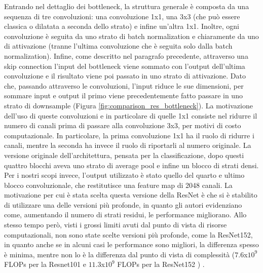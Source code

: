Entrando nel dettaglio dei bottleneck, la struttura generale è composta da una sequenza di tre convoluzioni: una convoluzione 1x1, una 3x3 (che può essere classica o dilatata a seconda dello strato) e infine un'altra 1x1. Inoltre, ogni convoluzione è seguita da uno strato di batch normalization e chiaramente da uno di attivazione (tranne l'ultima convoluzione che è seguita solo dalla batch normalization). Infine, come descritto nel paragrafo precedente, attraverso una skip connection l'input del bottleneck viene sommato con l'output dell'ultima convoluzione e il risultato viene poi passato in uno strato di attivazione. Dato che, passando attraverso le convoluzioni, l'input riduce le sue dimensioni, per sommare input e output il primo viene precedentemente fatto passare in uno strato di downsample  (Figura \ref{fig:comparison_res_bottleneck}).
La motivazione dell'uso di queste convoluzioni e in particolare di quelle 1x1 consiste nel ridurre il numero di canali prima di passare alla convoluzione 3x3, per motivi di costo computazionale. In particolare, la prima convoluzione 1x1 ha il ruolo di ridurre i canali, mentre la seconda ha invece il ruolo di riportarli al numero originale. La versione originale dell'architettura, pensata per la classificazione, dopo questi quattro blocchi aveva uno strato di average pool e infine un blocco di strati densi. Per i nostri scopi invece, l'output utilizzato è stato quello del quarto e ultimo blocco convoluzionale, che restitutisce una feature map di 2048 canali. La motivazione per cui è stata scelta questa versione della ResNet è che si è stabilito di utilizzare una delle versioni più profonde, in quanto gli autori evidenziano come, aumentando il numero di strati residui, le performance migliorano. Allo stesso tempo però, visti i grossi limiti avuti dal punto di vista di risorse computazionali, non sono state scelte versioni più profonde, come la ResNet152, in quanto anche se in alcuni casi le performance sono migliori, la differenza spesso è minima, mentre non lo è la differenza dal punto di vista di complessità ($7.6$x$10^9$ FLOPs per la Resnet101 e $11.3$x$10^9$ FLOPs per la ResNet152 \cite{resnets}) .















